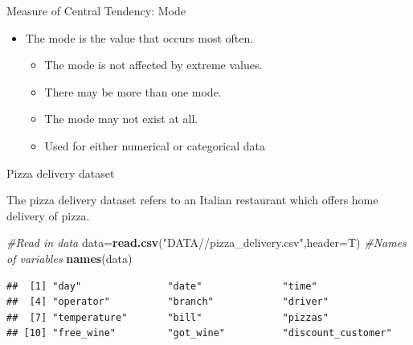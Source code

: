 \documentclass[ignorenonframetext,]{beamer}
\newenvironment{Shaded}{\begin{snugshade}}{\end{snugshade}}
\newcommand{\KeywordTok}[1]{\textcolor[rgb]{0.13,0.29,0.53}{\textbf{#1}}}
\newcommand{\DataTypeTok}[1]{\textcolor[rgb]{0.13,0.29,0.53}{#1}}
\newcommand{\StringTok}[1]{\textcolor[rgb]{0.31,0.60,0.02}{#1}}
\newcommand{\CommentTok}[1]{\textcolor[rgb]{0.56,0.35,0.01}{\textit{#1}}}
\newcommand{\NormalTok}[1]{#1}
\begin{document}
\begin{frame}{Measure of Central Tendency: Mode}

\begin{itemize}
\item
  The mode is the value that occurs most often.

  \begin{itemize}
  \item
    The mode is not affected by extreme values.
  \item
    There may be more than one mode.
  \item
    The mode may not exist at all.
  \item
    Used for either numerical or categorical data
  \end{itemize}
\end{itemize}

\end{frame}

\begin{frame}[fragile]{Pizza delivery dataset}

The pizza delivery dataset refers to an Italian restaurant which offers
home delivery of pizza.

\begin{Shaded}
\begin{Highlighting}[]
\CommentTok{#Read in data}
\NormalTok{data=}\KeywordTok{read.csv}\NormalTok{(}\StringTok{"DATA//pizza_delivery.csv"}\NormalTok{,}\DataTypeTok{header=}\NormalTok{T)}
\CommentTok{#Names of variables}
\KeywordTok{names}\NormalTok{(data)}
\end{Highlighting}
\end{Shaded}

\begin{verbatim}
##  [1] "day"               "date"              "time"             
##  [4] "operator"          "branch"            "driver"           
##  [7] "temperature"       "bill"              "pizzas"           
## [10] "free_wine"         "got_wine"          "discount_customer"
\end{verbatim}

\end{frame}
\end{document}
